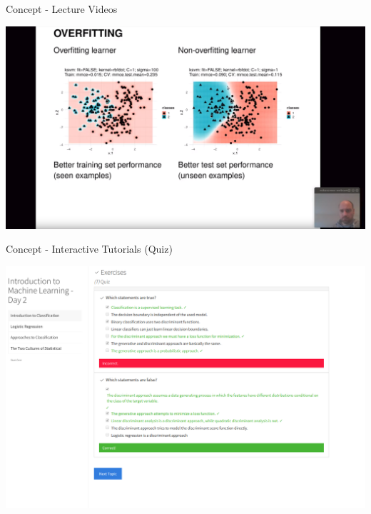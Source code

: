 \documentclass[10pt]{beamer}
\begin{document}
\begin{frame}{Concept - Lecture Videos}

  \begin{center}
      \includegraphics[width=\textwidth]{figures/iml_video.png}
  \end{center}

\end{frame}

\begin{frame}{Concept - Interactive Tutorials (Quiz)}

  \begin{center}
      \includegraphics[width=\textwidth]{figures/iml_tut0.png}
  \end{center}

\end{frame}
\end{document}
